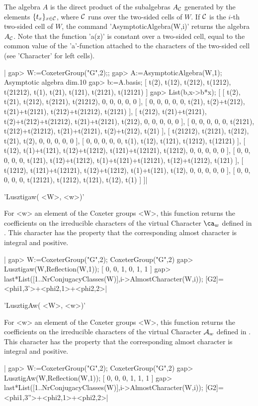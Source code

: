 The  algebra $A$ is the direct product of the subalgebras $A_{\mathcal C}$ generated
by  the elements $\{t_x\}_{x\in{\mathcal C}}$,  where ${\mathcal C}$ runs  over the two-sided
cells  of $W$. If  ${\mathcal C}$ is the  $i$-th two-sided cell  of $W$, the command
'AsymptoticAlgebra(W,i)'   returns  the  algebra  $A_{\mathcal C}$.  Note  that  the
function  'a(z)' is  constant over  a two-sided  cell, equal  to the common
value  of the 'a'-function attached to the characters of the two-sided cell
(see 'Character' for left cells).

|    gap> W:=CoxeterGroup("G",2);;
    gap> A:=AsymptoticAlgebra(W,1);
    Asymptotic algebra dim.10
    gap> b:=A.basis;
    [ t(2), t(12), t(212), t(1212), t(21212), t(1), t(21), t(121), 
      t(2121), t(12121) ]
    gap> List(b,x->b*x);
    [ [ t(2), t(21), t(212), t(2121), t(21212), 0, 0, 0, 0, 0 ], 
      [ 0, 0, 0, 0, 0, t(21), t(2)+t(212), t(21)+t(2121), t(212)+t(21212),
          t(2121) ], 
      [ t(212), t(21)+t(2121), t(2)+t(212)+t(21212), t(21)+t(2121), 
          t(212), 0, 0, 0, 0, 0 ], 
      [ 0, 0, 0, 0, 0, t(2121), t(212)+t(21212), t(21)+t(2121), 
          t(2)+t(212), t(21) ], 
      [ t(21212), t(2121), t(212), t(21), t(2), 0, 0, 0, 0, 0 ], 
      [ 0, 0, 0, 0, 0, t(1), t(12), t(121), t(1212), t(12121) ], 
      [ t(12), t(1)+t(121), t(12)+t(1212), t(121)+t(12121), t(1212), 0, 
          0, 0, 0, 0 ], 
      [ 0, 0, 0, 0, 0, t(121), t(12)+t(1212), t(1)+t(121)+t(12121), 
          t(12)+t(1212), t(121) ], 
      [ t(1212), t(121)+t(12121), t(12)+t(1212), t(1)+t(121), t(12), 0, 
          0, 0, 0, 0 ], 
      [ 0, 0, 0, 0, 0, t(12121), t(1212), t(121), t(12), t(1) ] ]|


'Lusztigaw( <W>, <w>)'

For  <w> an element  of the Coxeter  groups <W>, this  function returns the
coefficients on the irreducible characters of the virtual Character $\ca_w$
defined  in \cite[5.10.2]{Lus85}. This character  has the property that the
corresponding almost character is integral and positive.

|    gap> W:=CoxeterGroup("G",2);
    CoxeterGroup("G",2)
    gap> Lusztigaw(W,Reflection(W,1));
    [ 0, 0, 1, 0, 1, 1 ]
    gap> last*List([1..NrConjugacyClasses(W)],i->AlmostCharacter(W,i));
    [G2]=<phi{1,3}'>+<phi{2,1}>+<phi{2,2}>|


'LusztigAw( <W>, <w>)'

For  <w> an element  of the Coxeter  groups <W>, this  function returns the
coefficients on the irreducible characters of the virtual Character ${\mathcal A}_w$
defined  in \cite[5.10.2]{Lus85}. This character  has the property that the
corresponding almost character is integral and positive.

|    gap> W:=CoxeterGroup("G",2);      
    CoxeterGroup("G",2)
    gap> LusztigAw(W,Reflection(W,1));
    [ 0, 0, 0, 1, 1, 1 ]
    gap> last*List([1..NrConjugacyClasses(W)],i->AlmostCharacter(W,i));
    [G2]=<phi{1,3}''>+<phi{2,1}>+<phi{2,2}>|

